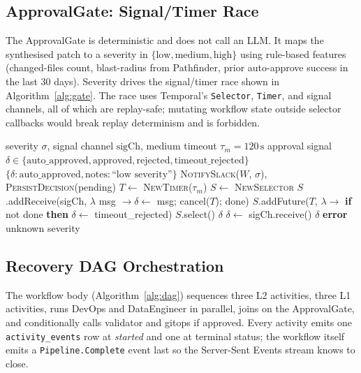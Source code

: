 \documentclass[manuscript,nonacm=true,screen=false,review=false]{acmart}
\begin{document}
\subsection{ApprovalGate: Signal/Timer Race}

The ApprovalGate is deterministic and does not call an LLM. It maps the synthesised patch to a severity in $\{\text{low}, \text{medium}, \text{high}\}$ using rule-based features (changed-files count, blast-radius from Pathfinder, prior auto-approve success in the last 30 days). Severity drives the signal/timer race shown in Algorithm~\ref{alg:gate}. The race uses Temporal's \texttt{Selector}, \texttt{Timer}, and signal channels, all of which are replay-safe; mutating workflow state outside selector callbacks would break replay determinism and is forbidden.

\begin{algorithm}
\caption{ApprovalGate severity router with signal/timer race}\label{alg:gate}
\begin{algorithmic}[1]
\Require severity $\sigma$, signal channel $\text{sigCh}$, medium timeout $\tau_m=120\,\text{s}$
\Ensure approval signal $\delta \in \{\text{auto\_approved}, \text{approved}, \text{rejected}, \text{timeout\_rejected}\}$
  \State \Return $\{\delta: \text{auto\_approved}, \text{notes}: \text{``low severity''}\}$
\EndIf
\State \textsc{NotifySlack}($W$, $\sigma$), \textsc{PersistDecision}(pending)
  \State $T \gets$ \textsc{NewTimer}($\tau_m$)
  \State $S \gets$ \textsc{NewSelector}
  \State $S$.addReceive(sigCh, $\lambda$ msg $\to \delta \gets$ msg; cancel($T$); done)
  \State $S$.addFuture($T$, $\lambda \to$ \textbf{if} not done \textbf{then} $\delta \gets$ timeout\_rejected)
  \State $S$.select()
  \State \Return $\delta$
  \State \(\delta \gets\) sigCh.receive() 
  \State \Return $\delta$
\Else
  \State \textbf{error} unknown severity 
\EndIf
\end{algorithmic}
\end{algorithm}

\subsection{Recovery DAG Orchestration}

The workflow body (Algorithm~\ref{alg:dag}) sequences three L2 activities, three L1 activities, runs DevOps and DataEngineer in parallel, joins on the ApprovalGate, and conditionally calls validator and gitops if approved. Every activity emits one \texttt{activity\_events} row at \emph{started} and one at terminal status; the workflow itself emits a \texttt{Pipeline.Complete} event last so the Server-Sent Events stream knows to close.
\end{document}
